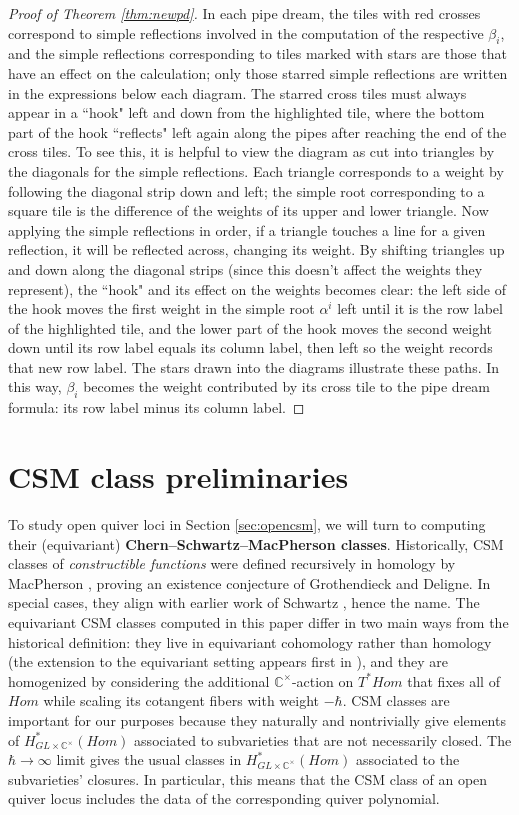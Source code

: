 \documentclass[reqno]{amsart}
\newcommand{\C}{\mathbb{C}}
\numberwithin{equation}{section}
\theoremstyle{definition}
\theoremstyle{remark}
\begin{document}
\begin{proof}[Proof of Theorem \ref{thm:newpd}]
In each pipe dream, the tiles with red crosses correspond to simple reflections involved in the computation of the respective $\beta_i$, and the simple reflections corresponding to tiles marked with stars are those that have an effect on the calculation; only those starred simple reflections are written in the expressions below each diagram. The starred cross tiles must always appear in a ``hook" left and down from the highlighted tile, where the bottom part of the hook ``reflects" left again along the pipes after reaching the end of the cross tiles. To see this, it is helpful to view the diagram as cut into triangles by the diagonals for the simple reflections. Each triangle corresponds to a weight by following the diagonal strip down and left; the simple root corresponding to a square tile is the difference of the weights of its upper and lower triangle. Now applying the simple reflections in order, if a triangle touches a line for a given reflection, it will be reflected across, changing its weight. By shifting triangles up and down along the diagonal strips (since this doesn't affect the weights they represent), the ``hook" and its effect on the weights becomes clear: the left side of the hook moves the first weight in the simple root $\alpha^i$ left until it is the row label of the highlighted tile, and the lower part of the hook moves the second weight down until its row label equals its column label, then left so the weight records that new row label. The stars drawn into the diagrams illustrate these paths.
In this way, $\beta_i$ becomes the weight contributed by its cross tile to the pipe dream formula: its row label minus its column label.
\end{proof}

\section{CSM class preliminaries}\label{sec:csm}
To study open quiver loci in Section \ref{sec:opencsm}, we will turn to computing their (equivariant) \textbf{Chern--Schwartz--MacPherson classes}. 
Historically, CSM classes of \emph{constructible functions} were defined recursively in homology by MacPherson \cite{Mac74}, proving an existence conjecture of Grothendieck and Deligne. In special cases, they align with earlier work of Schwartz \cite{schwartz1,schwartz2}, hence the name.
The equivariant CSM classes computed in this paper differ in two main ways from the historical definition: they live in equivariant cohomology rather than homology (the extension to the equivariant setting appears first in \cite{ohm06}), and they are homogenized by considering the additional $\C^\times$-action on $T^*Hom$ that fixes all of $Hom$ while scaling its cotangent fibers with weight $-\hbar$.
CSM classes are important for our purposes because they naturally and nontrivially give elements of $H^*_{GL \times \C^\times}(Hom)$ associated to subvarieties that are not necessarily closed. The $\hbar\to\infty$ limit gives the usual classes in $H^*_{GL \times \C^\times}(Hom)$ associated to the subvarieties' closures. In particular, this means that the CSM class of an open quiver locus includes the data of the corresponding quiver polynomial.
\end{document}
